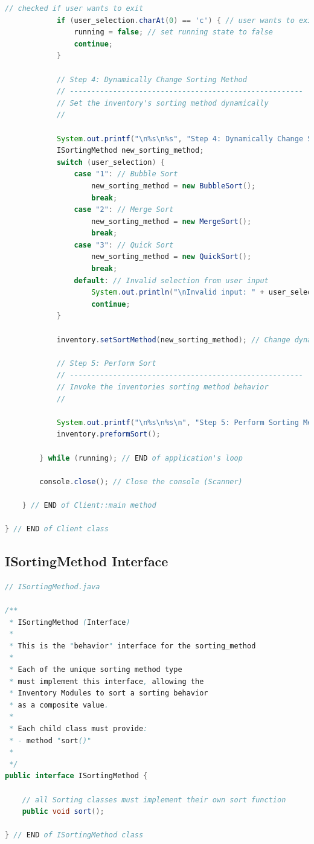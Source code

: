 \documentclass[12pt]{article}
\begin{document}
\begin{lstlisting}[language=Java]
            // checked if user wants to exit
            if (user_selection.charAt(0) == 'c') { // user wants to exit
                running = false; // set running state to false
                continue;
            }

            // Step 4: Dynamically Change Sorting Method
            // ------------------------------------------------------
            // Set the inventory's sorting method dynamically
            //
            
            System.out.printf("\n%s\n%s", "Step 4: Dynamically Change Sorting Method", dv);
            ISortingMethod new_sorting_method;
            switch (user_selection) {
                case "1": // Bubble Sort
                    new_sorting_method = new BubbleSort();
                    break;
                case "2": // Merge Sort
                    new_sorting_method = new MergeSort();
                    break;
                case "3": // Quick Sort
                    new_sorting_method = new QuickSort();
                    break;
                default: // Invalid selection from user input
                    System.out.println("\nInvalid input: " + user_selection);
                    continue;
            }
            
            inventory.setSortMethod(new_sorting_method); // Change dynamically to BubbleSort

            // Step 5: Perform Sort
            // ------------------------------------------------------
            // Invoke the inventories sorting method behavior
            //
            
            System.out.printf("\n%s\n%s\n", "Step 5: Perform Sorting Method", dv);
            inventory.preformSort();

        } while (running); // END of application's loop
        
        console.close(); // Close the console (Scanner)
        
    } // END of Client::main method

} // END of Client class
\end{lstlisting}

\subsection*{ISortingMethod Interface}
\begin{lstlisting}[language=Java]
// ISortingMethod.java

/**
 * ISortingMethod (Interface)
 * 
 * This is the "behavior" interface for the sorting_method
 * 
 * Each of the unique sorting method type
 * must implement this interface, allowing the
 * Inventory Modules to sort a sorting behavior
 * as a composite value.
 * 
 * Each child class must provide:
 * - method "sort()"
 *
 */
public interface ISortingMethod {
    
    // all Sorting classes must implement their own sort function
    public void sort();
    
} // END of ISortingMethod class
\end{lstlisting}
\end{document}
